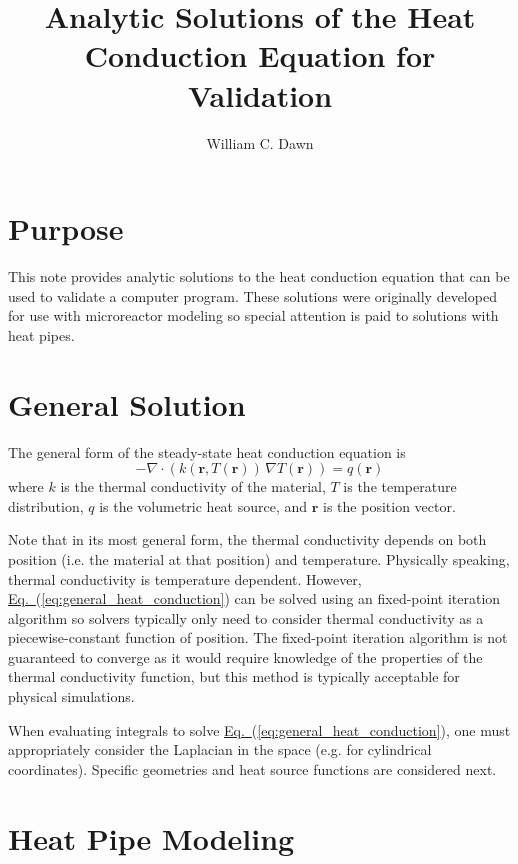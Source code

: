 \documentclass{article}
\title{Analytic Solutions of the Heat Conduction Equation for Validation}
\author{William C. Dawn}
\newcommand{\grad}{\nabla}
\newcommand{\vr}{\mathbf{r}}
\newcommand{\eref}[1]{\hyperref[#1]{Eq.~}(\ref{#1})}
\begin{document}
\maketitle

\section{Purpose}

This note provides analytic solutions to the heat conduction equation that can be used to validate a computer program.
These solutions were originally developed for use with microreactor modeling so special attention is paid to solutions with heat pipes.

\section{General Solution}

The general form of the steady-state heat conduction equation is
\begin{equation}
  \label{eq:general_heat_conduction}
  - \grad \cdot ( k(\vr, T(\vr)) \, \grad T(\vr) ) = q(\vr)
\end{equation}
where $k$ is the thermal conductivity of the material, $T$ is the temperature distribution, $q$ is the volumetric heat source, and $\vr$ is the position vector.

Note that in its most general form, the thermal conductivity depends on both position (i.e. the material at that position) and temperature.
Physically speaking, thermal conductivity is temperature dependent.
However, \eref{eq:general_heat_conduction} can be solved using an fixed-point iteration algorithm so solvers typically only need to consider thermal conductivity as a piecewise-constant function of position.
The fixed-point iteration algorithm is not guaranteed to converge as it would require knowledge of the properties of the thermal conductivity function, but this method is typically acceptable for physical simulations.

When evaluating integrals to solve \eref{eq:general_heat_conduction}, one must appropriately consider the Laplacian in the space (e.g. for cylindrical coordinates).
Specific geometries and heat source functions are considered next.

\section{Heat Pipe Modeling}
\end{document}
